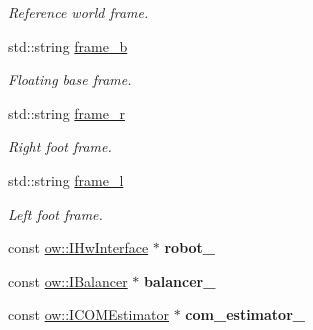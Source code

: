 \begin{DoxyCompactItemize}
\begin{DoxyCompactList}\small\item\em Reference world frame. \end{DoxyCompactList}\item 
std\+::string \hyperlink{classow__pub_1_1StatePublisher_a7cc9dcb411966fef757e2d4b37b7ca8c}{frame\+\_\+b}\hypertarget{classow__pub_1_1StatePublisher_a7cc9dcb411966fef757e2d4b37b7ca8c}{}\label{classow__pub_1_1StatePublisher_a7cc9dcb411966fef757e2d4b37b7ca8c}

\begin{DoxyCompactList}\small\item\em Floating base frame. \end{DoxyCompactList}\item 
std\+::string \hyperlink{classow__pub_1_1StatePublisher_a498acfe92bdd1ca629168b1088cb3390}{frame\+\_\+r}\hypertarget{classow__pub_1_1StatePublisher_a498acfe92bdd1ca629168b1088cb3390}{}\label{classow__pub_1_1StatePublisher_a498acfe92bdd1ca629168b1088cb3390}

\begin{DoxyCompactList}\small\item\em Right foot frame. \end{DoxyCompactList}\item 
std\+::string \hyperlink{classow__pub_1_1StatePublisher_ab0ea3594b8d71ea9ed0b796a99f0b3e3}{frame\+\_\+l}\hypertarget{classow__pub_1_1StatePublisher_ab0ea3594b8d71ea9ed0b796a99f0b3e3}{}\label{classow__pub_1_1StatePublisher_ab0ea3594b8d71ea9ed0b796a99f0b3e3}

\begin{DoxyCompactList}\small\item\em Left foot frame. \end{DoxyCompactList}\item 
const \hyperlink{classow_1_1IHwInterface}{ow\+::\+I\+Hw\+Interface} $\ast$ {\bfseries robot\+\_\+}\hypertarget{classow__pub_1_1StatePublisher_a91814d7d0867d3206b49c8a9f028e8c0}{}\label{classow__pub_1_1StatePublisher_a91814d7d0867d3206b49c8a9f028e8c0}

\item 
const \hyperlink{classow_1_1IBalancer}{ow\+::\+I\+Balancer} $\ast$ {\bfseries balancer\+\_\+}\hypertarget{classow__pub_1_1StatePublisher_a6e9f69904baafa3863bd6481ffcb1ec1}{}\label{classow__pub_1_1StatePublisher_a6e9f69904baafa3863bd6481ffcb1ec1}

\item 
const \hyperlink{classow_1_1ICOMEstimator}{ow\+::\+I\+C\+O\+M\+Estimator} $\ast$ {\bfseries com\+\_\+estimator\+\_\+}\hypertarget{classow__pub_1_1StatePublisher_aeebd2610b6d8100bac32a1a919907c56}{}\label{classow__pub_1_1StatePublisher_aeebd2610b6d8100bac32a1a919907c56}


\end{DoxyCompactItemize}
